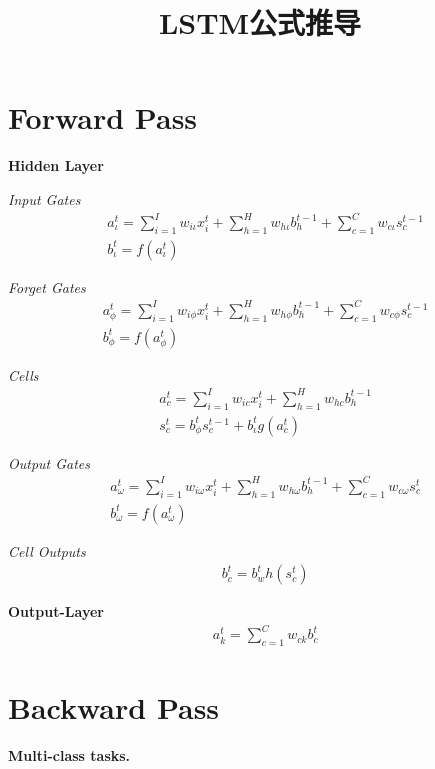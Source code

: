 \documentclass[UTF8]{article}
\title{LSTM公式推导}
\date{}
\begin{document}
    \maketitle
    \section{Forward Pass}
        \textbf{Hidden Layer}

        \emph{Input Gates}
        \begin{align}
        & a_\iota^t=\sum_{i=1}^Iw_{i\iota}x_i^t+\sum_{h=1}^Hw_{h\iota}b_h^{t-1}+\sum_{c=1}^Cw_{c\iota}s_c^{t-1} \\
        & b_\iota^t=f(a_\iota^t)
        \end{align}

        \emph{Forget Gates}
        \begin{align}
        & a_\phi^t=\sum_{i=1}^Iw_{i\phi}x_i^t+\sum_{h=1}^Hw_{h\phi}b_h^{t-1}+\sum_{c=1}^Cw_{c\phi}s_c^{t-1} \\
        & b_\phi^t=f(a_\phi^t)
        \end{align}

        \emph{Cells}
        \begin{align}
        & a_c^t=\sum_{i=1}^Iw_{ic}x_i^t+\sum_{h=1}^Hw_{hc}b_h^{t-1} \\
        & s_c^t=b_\phi^t s_c^{t-1} + b_\iota^tg(a_c^t)
        \end{align}

        \emph{Output Gates}
        \begin{align}
        & a_\omega^t=\sum_{i=1}^Iw_{i\omega}x_i^t+\sum_{h=1}^Hw_{h\omega}b_h^{t-1}+\sum_{c=1}^Cw_{c\omega}s_c^{t} \\
        & b_\omega^t=f(a_\omega^t)
        \end{align}

        \emph{Cell Outputs}
        \begin{align}
        & b_c^t=b_w^th(s_c^t)
        \end{align}

        \textbf{Output-Layer}
        \begin{align}
        & a_k^t=\sum_{c=1}^C w_{ck} b_c^t
        \end{align}

    \section{Backward Pass}
        \textbf{Multi-class tasks.}
\end{document}
